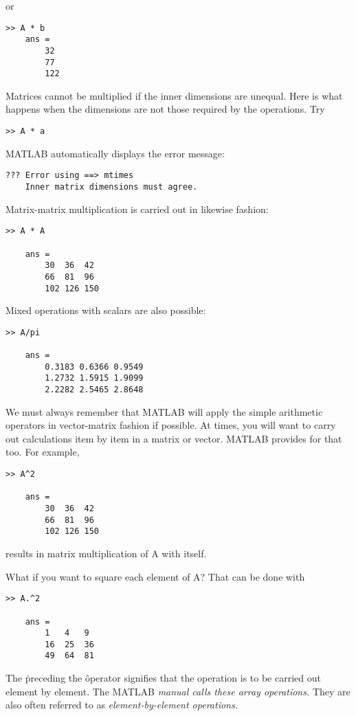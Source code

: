 \documentclass[../main.tex]{subfiles}
\begin{document}
or
\begin{lstlisting}[frame=none, numbers=none]
	>> A * b
	ans =
		32
		77
		122
\end{lstlisting}
Matrices cannot be multiplied if the inner dimensions are unequal. Here is what happens
when the dimensions are not those required by the operations. Try
\begin{lstlisting}[frame=none, numbers=none]
	>> A * a
\end{lstlisting}
MATLAB automatically displays the error message:
\begin{lstlisting}[frame=none, numbers=none]
	??? Error using ==> mtimes
	Inner matrix dimensions must agree.	
\end{lstlisting}
Matrix-matrix multiplication is carried out in likewise fashion:
\begin{lstlisting}[frame=none, numbers=none]
	>> A * A

	ans =
		30	36 	42
		66	81 	96
		102 126	150
\end{lstlisting}
Mixed operations with scalars are also possible:
\begin{lstlisting}[frame=none, numbers=none]
	>> A/pi

	ans =
		0.3183 0.6366 0.9549
		1.2732 1.5915 1.9099
		2.2282 2.5465 2.8648
\end{lstlisting}
We must always remember that MATLAB will apply the simple arithmetic operators
in vector-matrix fashion if possible. At times, you will want to carry out calculations item
by item in a matrix or vector. MATLAB provides for that too. For example,
\begin{lstlisting}[frame=none, numbers=none]
	>> A^2

	ans =
		30 	36 	42
		66 	81 	96
		102	126	150
\end{lstlisting}
results in matrix multiplication of A with itself.


What if you want to square each element of A? That can be done with
\begin{lstlisting}[frame=none, numbers=none]
	>> A.^2

	ans =
		1 	4 	9
		16 	25 	36
		49 	64 	81
\end{lstlisting}
The \. preceding the \^ operator signifies that the operation is to be carried out element by
element. The MATLAB \textsl{manual calls these array operations.} They are also often referred
to as \textsl{element-by-element operations.}
\end{document}

